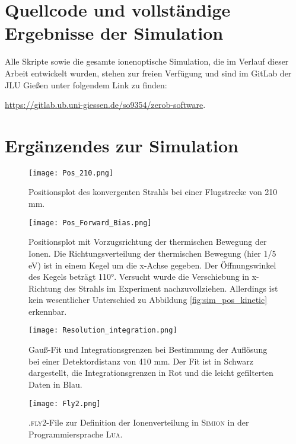 \clearpage
\section{Quellcode und vollständige Ergebnisse der Simulation}
Alle Skripte sowie die gesamte ionenoptische Simulation, die im Verlauf dieser Arbeit entwickelt wurden, stehen zur freien Verfügung und sind im GitLab der JLU Gießen unter folgendem Link zu finden:

\url{https://gitlab.ub.uni-giessen.de/so9354/zerob-software}.
\section{Ergänzendes zur Simulation}
\begin{figure}[H]
    \centering
    \texttt{[image: Pos\_210.png]}
    \caption[Positionsplot des konvergenten Strahls]{Positionsplot des konvergenten Strahls bei einer Flugstrecke von 210 mm.}
    \label{fig:pos_210}
\end{figure}

\begin{figure}[H]
    \centering
    \texttt{[image: Pos\_Forward\_Bias.png]}
    \caption[Positionsplot mit Vorzugsrichtung der thermischen Bewegung]{Positionsplot mit Vorzugsrichtung der thermischen Bewegung der Ionen. Die Richtungsverteilung der thermischen Bewegung (hier 1/5 eV) ist in einem Kegel um die x-Achse gegeben. Der Öffnungswinkel des Kegels beträgt 110°. Versucht wurde die Verschiebung in x-Richtung des Strahls im Experiment nachzuvollziehen. Allerdings ist kein wesentlicher Unterschied zu Abbildung \ref{fig:sim_pos_kinetic} erkennbar.}
    \label{fig:pos_bias}
\end{figure}   

\begin{landscape}
    \begin{figure}
        \centering
        \hspace{-4cm}\texttt{[image: Resolution\_integration.png]}
        \caption[Gauß-Fit und Integrationsgrenzen bei Bestimmung der Auflösung]{Gauß-Fit und Integrationsgrenzen bei Bestimmung der Auflösung bei einer Detektordistanz von 410 mm. Der Fit ist in Schwarz dargestellt, die Integrationsgrenzen in Rot und die leicht gefilterten Daten in Blau.}
        \label{fig:integrationsgrenzen}
    \end{figure}
\end{landscape}

\begin{figure}
    \centering
    \texttt{[image: Fly2.png]}
    \caption[Ionenverteilung \textsc{.fly2}-File]{\textsc{.fly2}-File zur Definition der Ionenverteilung in \textsc{Simion} in der Programmiersprache \textsc{Lua}.}
    \label{fly2}
\end{figure}